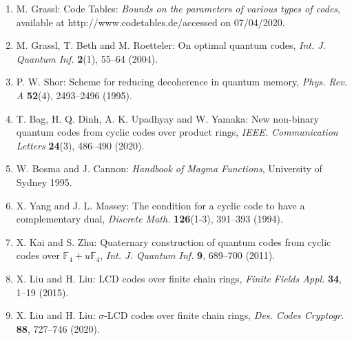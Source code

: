 \documentclass[12pt]{article}
\begin{document}
\begin{enumerate}
\item M. Grassl: Code Tables: \textit{Bounds on the parameters of various types of codes}, available at http://www.codetables.de/accessed on 07/04/2020.
\item M. Grassl, T. Beth and M. Roetteler: On optimal quantum codes, \textit{Int. J. Quantum Inf.} \textbf{2}(1), 55--64 (2004).
\item P. W. Shor: Scheme for reducing decoherence in quantum memory, \textit{Phys. Rev. A} \textbf{52}(4), 2493--2496 (1995).
\item T. Bag, H. Q. Dinh, A. K. Upadhyay and W. Yamaka: New non-binary quantum codes from cyclic codes over product rings, \textit{IEEE. Communication Letters} \textbf{24}(3), 486--490 (2020).
\item W. Bosma and J. Cannon: \textit{Handbook of Magma Functions}, University of Sydney 1995.
\item X. Yang and J. L. Massey: The condition for a cyclic code to have a complementary dual, \textit{Discrete Math.} \textbf{126}(1-3), 391--393 (1994).
\item X. Kai and S. Zhu: Quaternary construction of quantum codes from cyclic codes over $\mathbb{F}_4 + u\mathbb{F}_4$, \textit{Int. J. Quantum Inf.} \textbf{9}, 689--700 (2011).
\item X. Liu and H. Liu: LCD codes over finite chain rings, \textit{Finite Fields Appl.} \textbf{34}, 1--19 (2015).
\item X. Liu and H. Liu: $\sigma$-LCD codes over finite chain rings, \textit{Des. Codes Cryptogr.} \textbf{88}, 727--746 (2020).
\end{enumerate}
\end{document}
